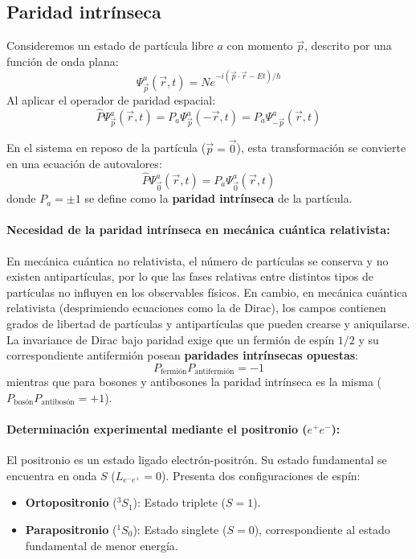 \subsection{Paridad intrínseca}

Consideremos un estado de partícula libre $a$ con momento $\vec{p}$, descrito por una función de onda plana:
\begin{equation}
    \Psi_{\vec{p}}^a(\vec{r}, t) = N e^{-i(\vec{p}\cdot\vec{r} - Et)/\hbar}
\end{equation}
Al aplicar el operador de paridad espacial:
\begin{equation}
    \hat{P} \Psi_{\vec{p}}^a(\vec{r}, t) = P_a \Psi_{\vec{p}}^a(-\vec{r}, t) = P_a \Psi_{-\vec{p}}^a(\vec{r}, t)
\end{equation}

En el sistema en reposo de la partícula ($\vec{p} = \vec{0}$), esta transformación se convierte en una ecuación de autovalores:
\begin{equation}
    \hat{P} \Psi_{\vec{0}}^a(\vec{r}, t) = P_a \Psi_{\vec{0}}^a(\vec{r}, t)
\end{equation}
donde $P_a = \pm 1$ se define como la \textbf{paridad intrínseca} de la partícula.

\paragraph{Necesidad de la paridad intrínseca en mecánica cuántica relativista:}
En mecánica cuántica no relativista, el número de partículas se conserva y no existen antipartículas, por lo que las fases relativas entre distintos tipos de partículas no influyen en los observables físicos. En cambio, en mecánica cuántica relativista (desprimiendo ecuaciones como la de Dirac), los campos contienen grados de libertad de partículas y antipartículas que pueden crearse y aniquilarse. La invariance de Dirac bajo paridad exige que un fermión de espín $1/2$ y su correspondiente antifermión posean \textbf{paridades intrínsecas opuestas}:
\begin{equation}
    P_{\text{fermión}} P_{\text{antifermión}} = -1
\end{equation}
mientras que para bosones y antibosones la paridad intrínseca es la misma ($P_{\text{bosón}} P_{\text{antibosón}} = +1$).

\paragraph{Determinación experimental mediante el positronio ($e^+ e^-$):}
El positronio es un estado ligado electrón-positrón. Su estado fundamental se encuentra en onda $S$ ($L_{e^-e^+} = 0$). Presenta dos configuraciones de espín:
\begin{itemize}
    \item \textbf{Ortopositronio} ($^3S_1$): Estado triplete ($S = 1$).
    \item \textbf{Parapositronio} ($^1S_0$): Estado singlete ($S = 0$), correspondiente al estado fundamental de menor energía.
\end{itemize}

